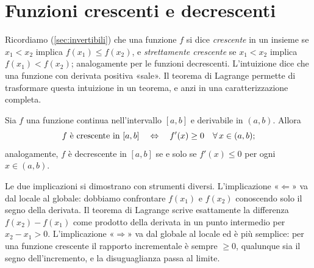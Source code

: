 \section{Funzioni crescenti e decrescenti}
\label{sec:monotonia}

Ricordiamo (\cref{sec:invertibili}) che una funzione $f$ si dice
\emph{crescente} in un insieme se $x_{1}<x_{2}$ implica $f(x_{1})\le f(x_{2})$, e
\emph{strettamente crescente} se $x_{1}<x_{2}$ implica $f(x_{1})<f(x_{2})$; analogamente
per le funzioni decrescenti. L'intuizione dice che una funzione con derivata positiva
«sale». Il teorema di Lagrange permette di trasformare questa intuizione in un
teorema, e anzi in una caratterizzazione completa.

\begin{teorema}\label{teo:criterio-monotonia}
Sia $f$ una funzione continua nell'intervallo $[a,b]$ e derivabile in $(a,b)$. Allora
\begin{equation}\label{eq:criterio-monotonia}
  f \text{ è crescente in } [a,b] \quad\Leftrightarrow\quad f'(x)\ge0 \quad\forall\, x\in(a,b);
\end{equation}
analogamente, $f$ è decrescente in $[a,b]$ se e solo se $f'(x)\le0$ per ogni
$x\in(a,b)$.
\end{teorema}

\begin{schema}
\end{schema}

\begin{strategia}
Le due implicazioni si dimostrano con strumenti diversi. L'implicazione «$\Leftarrow$»
va dal locale al globale: dobbiamo confrontare $f(x_{1})$ e $f(x_{2})$ conoscendo solo il
segno della derivata. Il teorema di Lagrange scrive esattamente la differenza
$f(x_{2})-f(x_{1})$ come prodotto della derivata in un punto intermedio per
$x_{2}-x_{1}>0$. L'implicazione «$\Rightarrow$» va dal globale al locale ed è più
semplice: per una funzione crescente il rapporto incrementale è sempre $\ge0$, qualunque
sia il segno dell'incremento, e la disuguaglianza passa al limite.
\end{strategia}

